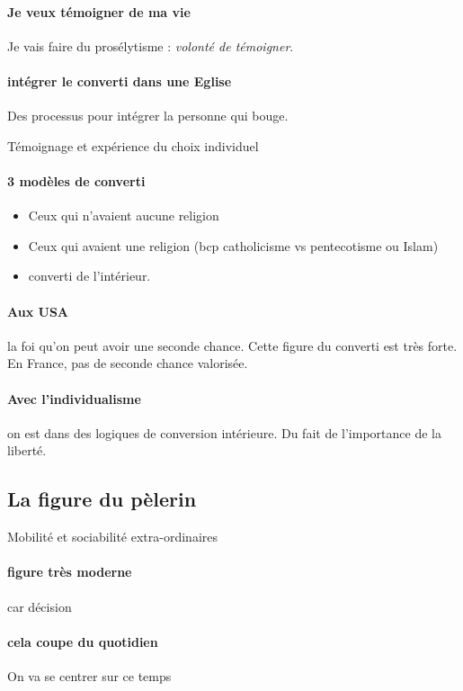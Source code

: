\paragraph{Je veux témoigner de ma vie} Je vais faire du prosélytisme : \textit{volonté de témoigner}. 

\paragraph{intégrer le converti dans une Eglise} Des processus pour intégrer la personne qui bouge. 

Témoignage et expérience du choix individuel
\paragraph{3 modèles de converti}
\begin{itemize}
    \item Ceux qui n'avaient aucune religion
    \item Ceux qui avaient une religion (bcp catholicisme vs pentecotisme ou Islam)
    \item converti de l'intérieur.
\end{itemize}

\paragraph{Aux USA} la foi qu'on peut avoir une seconde chance. Cette figure du converti est très forte. En France, pas de seconde chance valorisée.


\paragraph{Avec l'individualisme} on est dans des logiques de conversion intérieure. Du fait de l'importance de la liberté.


\subsection{La figure du pèlerin}

Mobilité et sociabilité extra-ordinaires

\paragraph{figure très moderne} car décision

\paragraph{cela coupe du quotidien} On va se centrer sur ce temps

